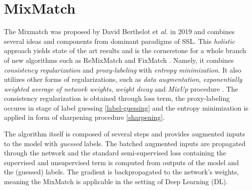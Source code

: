 \section{MixMatch}
\label{sec:mix-match}
The Mixmatch was proposed by David Berthelot et \textit{al.} in 2019 \cite{mixmatch-2019} and combines several ideas and components from dominant paradigms of SSL.
This \textit{holistic} approach yields state of the art results and is the cornerstone for a whole branch of new algorithms such as ReMixMatch \cite{remixmatch-2020}
and FixMatch \cite{fixmatch-2020}. Namely, it combines \textit{consistency regularization} and \textit{proxy-labeling} with \textit{entropy minimization}.
It also utilizes other forms of regularizations, such as \textit{data augmentation}, \textit{exponentially weighted average of network weights}\cite{mean-teacher-2018},
\textit{weight decay} \cite{weight-decay-2019} and \textit{MixUp} procedure \cite{mixup-2018}. The consistency regularization is obtained through loss term, the 
proxy-labeling occures in stage of label guessing \ref{label-guessing} and the entropy minimization is applied in form of sharpening procedure \ref{sharpening}.

The algorithm itself is composed of several steps and provides augmented inputs to the model with \textit{guessed} labels. The batched augmented inputs are propagated 
through the network and the standard semi-supervised loss containing the supervised and unsupervised term is computed from outputs of the model and the (guessed) 
labels. The gradient is backpropagated to the network's weights, meaning the MixMatch is applicable in the setting of Deep Learning (DL).

